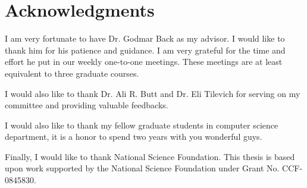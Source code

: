 \chapter*{Acknowledgments}

I am very fortunate to have Dr. Godmar Back as my advisor.  I would like to
thank him for his patience and guidance. I am very grateful for the time and
effort he put in our weekly one-to-one meetings. These meetings are
at least equivalent to three graduate courses.

I would also like to thank Dr. Ali R. Butt and Dr. Eli Tilevich for serving
on my committee and providing valuable feedbacks.

I would also like to thank my fellow graduate students in computer science
department, it is a honor to spend two years with you wonderful guys.

Finally, I would like to thank National Science Foundation.
This thesis is based upon work supported by the National Science Foundation 
under Grant No. CCF-0845830.